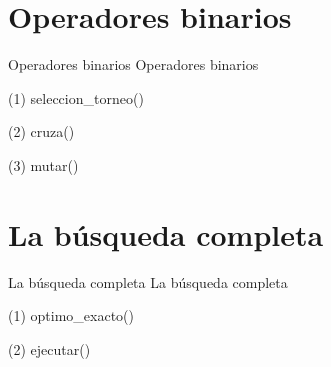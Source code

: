 
\section{Operadores binarios}

\begin{frame}{Operadores binarios}
Operadores binarios
\end{frame}

\begin{frame}[fragile]{(1) seleccion\_torneo()}

\end{frame}

\begin{frame}[fragile]{(2) cruza()}

\end{frame}

\begin{frame}[fragile]{(3) mutar()}

\end{frame}


\section{La búsqueda completa}

\begin{frame}{La búsqueda completa}
La búsqueda completa
\end{frame}

\begin{frame}[fragile]{(1) optimo\_exacto()}

\end{frame}

\begin{frame}[fragile]{(2) ejecutar()}

\end{frame}

